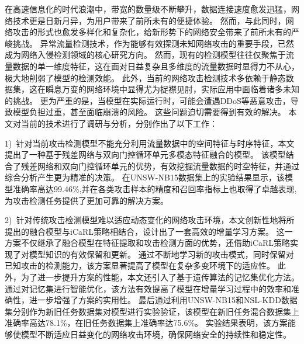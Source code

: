 \begin{cabstract}
在高速信息化的时代浪潮中，带宽的数量级不断攀升，数据连接速度愈发迅猛，网络技术更是日新月异，为用户带来了前所未有的便捷体验。
然而，与此同时，网络攻击的形式也愈发多样化和复杂化，给新形势下的网络安全带来了前所未有的严峻挑战。
异常流量检测技术，作为能够有效探测未知网络攻击的重要手段，已然成为网络入侵检测领域的核心研究方向。
然而，现有的检测模型往往仅聚焦于流量数据的单一维度特征，这在面对日益复杂且多维度的流量数据时显得力不从心，极大地削弱了模型的检测效能。
此外，当前的网络攻击检测技术多依赖于静态数据集，这在瞬息万变的网络环境中显得尤为捉襟见肘，实际应用中面临着诸多未知的挑战。
更为严重的是，当模型在实际运行时，可能会遭遇DDoS等恶意攻击，导致模型负担过重，甚至面临崩溃的风险。
这些问题迫切需要得到有效的解决。
本文对当前的技术进行了调研与分析，分别作出了以下工作：\par

1)~针对当前攻击检测模型不能充分利用流量数据中的空间特征与时序特征，本文提出了一种基于残差网络与双向门控循环单元多模态特征融合的模型。
该模型结合了残差网络和双向门控循环单元的优势，有效挖掘流量数据的时空特征，并通过综合分析产生更为精准的决策。
在UNSW-NB15数据集上的实验结果显示，该模型准确率高达99.46\%,并在各类攻击样本的精度和召回率指标上也取得了卓越表现,为攻击检测任务提供了更加可靠的解决方案。\par

2)~针对传统攻击检测模型难以适应动态变化的网络攻击环境，本文创新性地将所提出的融合模型与iCaRL策略相结合，设计出了一套高效的增量学习方案。
这一方案不仅继承了融合模型在特征提取和攻击检测方面的优势，还借助iCaRL策略实现了对模型知识的有效保留和更新。
通过不断地学习新的攻击模式，同时保留对已知攻击的检测能力，该方案显著提高了模型在复杂多变环境下的适应性。
此外，为了进一步提升方案的性能，本文还引入了基于遗传算法的记忆集优化方法。
通过对记忆集进行智能优化，该方法有效提高了模型在增量学习过程中的效率和准确性，进一步增强了方案的实用性。
最后通过利用UNSW-NB15和NSL-KDD数据集分别作为新旧任务数据集对模型进行实验验证，该模型在新旧任务混合数据集上准确率高达78.1\%，在旧任务数据集上准确率达75.6\%。
实验结果表明，该方案能够使模型不断适应日益变化的网络攻击环境，确保网络安全的持续性和稳定性。\par


\end{cabstract}
